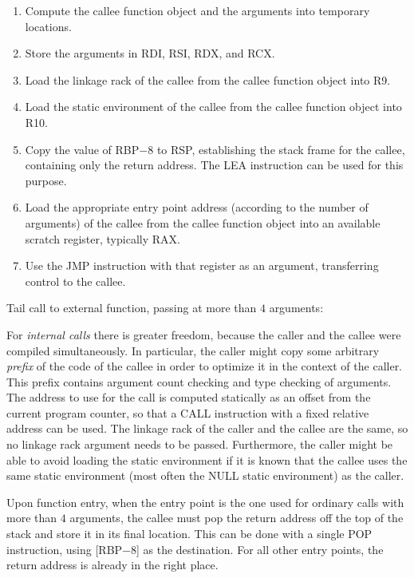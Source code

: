 \begin{enumerate}
\item Compute the callee function object and the arguments into
  temporary locations.
\item Store the arguments in RDI, RSI, RDX, and RCX.
\item Load the linkage rack of the callee from the callee
  function object into R9.
\item Load the static environment of the callee from the callee
  function object into R10.
\item Copy the value of RBP$ - 8$ to RSP, establishing the stack frame
  for the callee, containing only the return address.  The LEA
  instruction can be used for this purpose.
\item Load the appropriate entry point address (according to the
  number of arguments) of the callee from the callee function object
  into an available scratch register, typically RAX.
\item Use the JMP instruction with that register as an argument,
  transferring control to the callee.
\end{enumerate}

Tail call to external function, passing at more than $4$ arguments:%

For \emph{internal calls} there is greater freedom, because the caller
and the callee were compiled simultaneously.  In particular, the
caller might copy some arbitrary \emph{prefix} of the code of the
callee in order to optimize it in the context of the caller.  This
prefix contains argument count checking and type checking of
arguments.  The address to use for the call is computed statically as
an offset from the current program counter, so that a CALL instruction
with a fixed relative address can be used.  The linkage rack of the
caller and the callee are the same, so no linkage rack argument
needs to be passed.  Furthermore, the caller might be able to avoid
loading the static environment if it is known that the callee uses the
same static environment (most often the NULL static environment) as
the caller.

Upon function entry, when the entry point is the one used for ordinary
calls with more than $4$ arguments, the callee must pop the return
address off the top of the stack and store it in its final location.
This can be done with a single POP instruction, using [RBP$ - 8$] as
the destination.   For all other entry points, the return address is
already in the right place.

